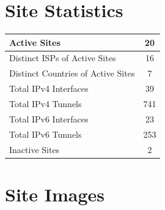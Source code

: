 



\chapter{Site Statistics}
\label{cha:Site-Statistics}


\begin{small}
\begin{center}
\begin{longtable}{|c|c|}
 \hline
 \multicolumn{1}{|l|}{Active Sites} & 20 \\ \hline
 \multicolumn{1}{|l|}{Distinct ISPs of Active Sites} & 16 \\ \hline
 \multicolumn{1}{|l|}{Distinct Countries of Active Sites} & 7 \\ \hline
 \multicolumn{1}{|l|}{Total IPv4 Interfaces} & 39 \\ \hline
 \multicolumn{1}{|l|}{Total IPv4 Tunnels} & 741 \\ \hline
 \multicolumn{1}{|l|}{Total IPv6 Interfaces} & 23 \\ \hline
 \multicolumn{1}{|l|}{Total IPv6 Tunnels} & 253 \\ \hline
 \multicolumn{1}{|l|}{Inactive Sites} & 2 \\ \hline
\end{longtable}
\end{center}
\end{small}




\chapter{Site Images}
\label{cha:Images}


